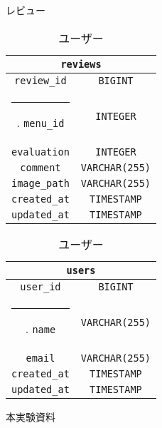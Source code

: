 \documentclass[a4paper]{ltjsarticle}
\makeatletter
\def\Hline{
    \noalign{\ifnum0=`}\fi\hrule \@height 2.\arrayrulewidth \futurelet
    \reserved@a\@xhline}
\makeatother
\begin{document}
        \begin{table}[ht]
            \begin{minipage}[t]{.49\textwidth}
                \center
                \caption{レビュー}
                \label{reviews}
                \begin{tabular}{|c|c|}
                    \hline
                    \multicolumn{2}{|c|}{\texttt{reviews}} \\ \hline \hline
                    \verb|review_id| & \verb|BIGINT| \\ \Hline
                    \verb|menu_id| & \verb|INTEGER| \\ \hline
                    \verb|evaluation| & \verb|INTEGER| \\ \hline
                    \verb|comment| & \verb|VARCHAR(255)| \\ \hline
                    \verb|image_path| & \verb|VARCHAR(255)| \\ \hline
                    \verb|created_at| & \verb|TIMESTAMP| \\ \hline
                    \verb|updated_at| & \verb|TIMESTAMP| \\ \hline
                \end{tabular}
            \end{minipage}
            \begin{minipage}[t]{.49\textwidth}
                \center
                \caption{ユーザー}
                \label{users}
                \begin{tabular}{|c|c|}
                    \hline
                    \multicolumn{2}{|c|}{\texttt{users}} \\ \hline \hline
                    \verb|user_id| & \verb|BIGINT| \\ \Hline
                    \verb|name| & \verb|VARCHAR(255)| \\ \hline
                    \verb|email| & \verb|VARCHAR(255)| \\ \hline
                    \verb|created_at| & \verb|TIMESTAMP| \\ \hline
                    \verb|updated_at| & \verb|TIMESTAMP| \\ \hline
                \end{tabular}
            \end{minipage}
        \end{table}

\begin{thebibliography}{9}
     本実験資料
\end{thebibliography}
\end{document}
